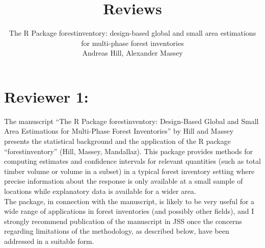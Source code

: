 \documentclass{article}
\title{Reviews}
\author{The R Package forestinventory: design-based global and small area estimations for multi-phase forest inventories\\
Andreas Hill, Alexander Massey}
\begin{document}

\maketitle
\thispagestyle{empty}
\newpage

\setcounter{page}{1}

\pagestyle{fancy} %
\fancyfoot[C]{\thepage}
\setlength{\headsep}{15mm}

\newcommand{\answer}[1]{\small \color{mybrown}{#1} \color{black}}
\newcommand{\note}[1]{\textit{\small \color{amaranth} \textbf{Note:} #1} \color{black}}
\newcommand{\todo}[1]{\color{red}{#1} \color{black}}
\newcommand{\answerfin}[1]{\small \color{mygreen}{#1} \color{black}}



\section*{Reviewer 1:}

The manuscript “The R Package forestinventory: Design-Based Global and Small Area Estimations for Multi-Phase Forest Inventories” by Hill and Massey presents the statistical background and the application of the R package “forestinventory” (Hill, Massey, Mandallaz). This package provides methods for computing estimates and confidence intervals for relevant quantities (such as total timber volume or volume in a subset) in a typical forest inventory setting where precise information about the response is only available at a small sample of locations while explanatory data is available for a wider area.\\

The package, in connection with the manuscript, is likely to be very useful for a wide range of applications in forest inventories (and possibly other fields), and I strongly recommend publication of the manuscript in JSS once the concerns regarding limitations of the methodology, as described below, have been addressed in a suitable form.\\
\end{document}
